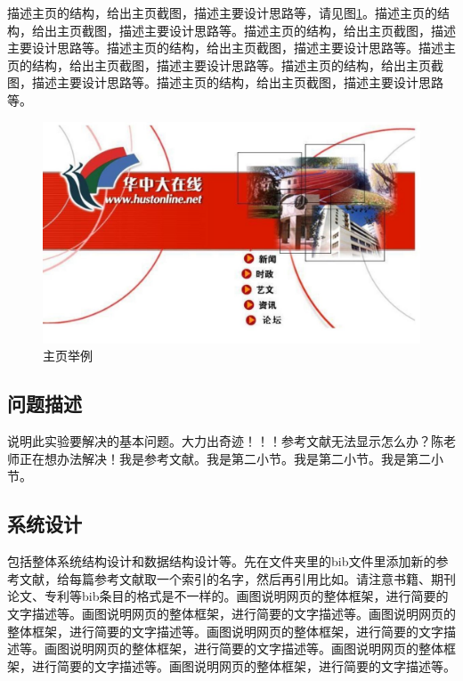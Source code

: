 \documentclass[supercite]{Experimental_Report}
\theoremstyle{definition}
\begin{document}
描述主页的结构，给出主页截图，描述主要设计思路等，请见图\ref{fig2-1}。描述主页的结构，给出主页截图，描述主要设计思路等。描述主页的结构，给出主页截图，描述主要设计思路等。描述主页的结构，给出主页截图，描述主要设计思路等。描述主页的结构，给出主页截图，描述主要设计思路等。描述主页的结构，给出主页截图，描述主要设计思路等。描述主页的结构，给出主页截图，描述主要设计思路等。

\begin{figure}[htb]
	\begin{center}
		\includegraphics[scale=0.40]{images/2-1.jpg}
		\caption{主页举例}
		\label{fig2-1}
	\end{center}
\end{figure}

\subsection{问题描述}

说明此实验要解决的基本问题。大力出奇迹！！！参考文献无法显示怎么办？陈老师正在想办法解决\cite{STR2021Neurocom, AVS2021Neurocom}！我是参考文献。我是第二小节\cite{Mehrabian1974An}。我是第二小节\cite{Rezaei2014CVPR}。我是第二小节\cite{Ramnath2008IJCV}。

\subsection{系统设计}

包括整体系统结构设计和数据结构设计等。先在文件夹里的bib文件里添加新的参考文献，给每篇参考文献取一个索引的名字，然后再引用比如\cite{STR2021Neurocom}\cite{AVS2021Neurocom, Rezaei2014CVPR}。请注意书籍、期刊论文、专利等bib条目的格式是不一样的。画图说明网页的整体框架，进行简要的文字描述等。画图说明网页的整体框架，进行简要的文字描述等。画图说明网页的整体框架，进行简要的文字描述等。画图说明网页的整体框架，进行简要的文字描述等。画图说明网页的整体框架，进行简要的文字描述等。画图说明网页的整体框架，进行简要的文字描述等。画图说明网页的整体框架，进行简要的文字描述等。
\end{document}
